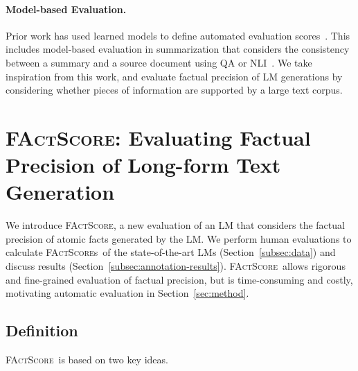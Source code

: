 \documentclass[11pt]{article}
\newcommand{\ours}{\textsc{FActScore}}
\newcommand{\ourScores}{\textsc{FActScore}s}
\begin{document}
\vspace{-.3em}
\paragraph{Model-based Evaluation.}
Prior work has used learned models to define automated evaluation scores~\citep{zhang2019bertscore,liu2023gpteval}.
This includes model-based evaluation in summarization that considers the consistency between a summary and a source document using QA or NLI~\citep{kryscinski2019evaluating,wang2020asking,fabbri2021qafacteval,deutsch2021towards,laban2022summac}.
We take inspiration from this work, and evaluate factual precision of LM generations by considering whether pieces of information are supported by a large text corpus.





\section{\ours: Evaluating Factual Precision of Long-form Text Generation}\label{sec:benchmark}

We introduce \ours, a new evaluation of an LM that considers the factual precision of atomic facts generated by the LM.
We perform human evaluations to calculate \ourScores\ of the state-of-the-art LMs (Section~\ref{subsec:data}) and discuss results (Section~\ref{subsec:annotation-results}).
%
\ours\ allows rigorous and fine-grained evaluation of factual precision, but is time-consuming and costly, motivating automatic evaluation in Section~\ref{sec:method}.


\subsection{Definition}
\label{subsec:data-overview}

\ours\ is based on two key ideas.
\end{document}
